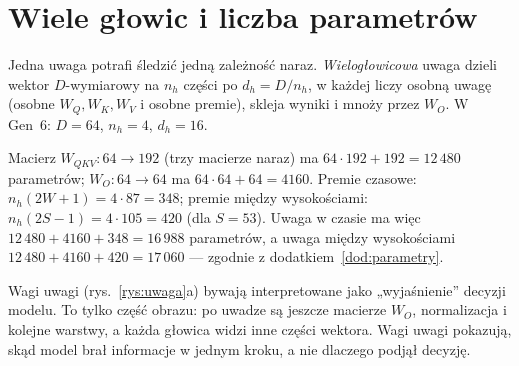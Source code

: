 \begin{figure}[ht]
\centering
{}
\end{figure}

\section{Wiele głowic i liczba parametrów}

Jedna uwaga potrafi śledzić jedną zależność naraz. \emph{Wielogłowicowa} uwaga dzieli wektor $D$-wymiarowy na $n_h$ części po $d_h=D/n_h$, w każdej liczy osobną uwagę (osobne $W_Q,W_K,W_V$ i osobne premie), skleja wyniki i mnoży przez $W_O$.
W Gen~6: $D=64$, $n_h=4$, $d_h=16$.

\begin{naliczbach}
Macierz $W_{QKV}\colon64\to192$ (trzy macierze naraz) ma $64\cdot192+192=12\,480$ parametrów; $W_O\colon64\to64$ ma $64\cdot64+64=4160$. Premie czasowe: $n_h(2W+1)=4\cdot87=348$; premie między wysokościami: $n_h(2S-1)=4\cdot105=420$
(dla $S=53$). Uwaga w czasie ma więc $12\,480+4160+348=16\,988$ parametrów, a uwaga między wysokościami $12\,480+4160+420=17\,060$ --- zgodnie z dodatkiem~\ref{dod:parametry}.
\end{naliczbach}

\begin{pulapka}
Wagi uwagi (rys.~\ref{rys:uwaga}a) bywają interpretowane jako „wyjaśnienie” decyzji modelu. To tylko część obrazu: po uwadze są jeszcze macierze $W_O$, normalizacja i kolejne warstwy, a każda głowica widzi inne części wektora. Wagi uwagi pokazują, skąd model brał informacje w jednym kroku, a nie dlaczego podjął decyzję.
\end{pulapka}

